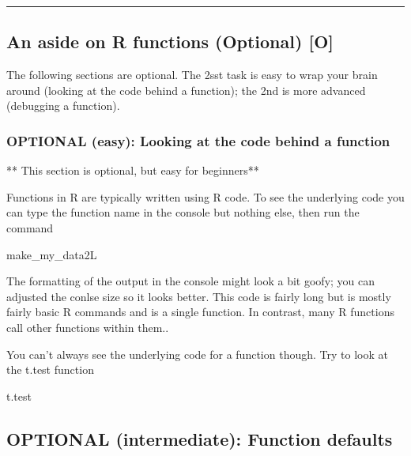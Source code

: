\documentclass[]{book}
\newenvironment{Shaded}{\begin{snugshade}}{\end{snugshade}}
\newcommand{\NormalTok}[1]{#1}
\theoremstyle{definition}
\theoremstyle{definition}
\theoremstyle{definition}
\theoremstyle{remark}
\begin{document}
\begin{center}\rule{0.5\linewidth}{\linethickness}\end{center}

\subsection{An aside on R functions (Optional)
{[}O{]}}\label{an-aside-on-r-functions-optional-o}

The following sections are optional. The 2sst task is easy to wrap your
brain around (looking at the code behind a function); the 2nd is more
advanced (debugging a function).

\subsubsection{OPTIONAL (easy): Looking at the code behind a
function}\label{optional-easy-looking-at-the-code-behind-a-function}

** This section is optional, but easy for beginners**

Functions in R are typically written using R code. To see the underlying
code you can type the function name in the console but nothing else,
then run the command

\begin{Shaded}
\begin{Highlighting}[]
\NormalTok{make_my_data2L}
\end{Highlighting}
\end{Shaded}

The formatting of the output in the console might look a bit goofy; you
can adjusted the conlse size so it looks better. This code is fairly
long but is mostly fairly basic R commands and is a single function. In
contrast, many R functions call other functions within them..

You can't always see the underlying code for a function though. Try to
look at the t.test function

\begin{Shaded}
\begin{Highlighting}[]
\NormalTok{t.test}
\end{Highlighting}
\end{Shaded}

\subsection{OPTIONAL (intermediate): Function
defaults}\label{optional-intermediate-function-defaults}
\end{document}
